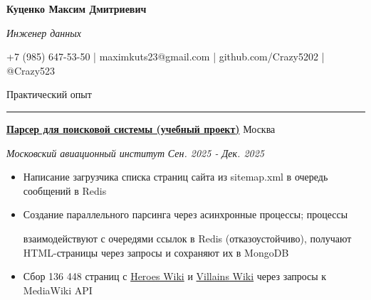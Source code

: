\documentclass[14pt, a4paper, oneside]{extarticle}
\begin{document}



\begin{center}
    \textbf{\LARGE Куценко Максим Дмитриевич}
    
    \textit{\Large Инженер данных}
\end{center}

\begin{center}
	\vspace{-0.5\intextsep}
	\small
    \faPhone* \space +7 (985) 647-53-50 | \faEnvelope \space maximkuts23@gmail.com | \faGithub \space github.com/Crazy5202 | \faTelegram \space @Crazy523
\end{center}


\begin{flushleft}
	\vspace{-\intextsep}
	\large Практический опыт
\end{flushleft}

\vspace{-0.8\intextsep}
\hrule


\begin{flushleft}
	\vspace{-0.8\intextsep}
	\quad
	\href{https://github.com/Crazy5202/infsearch/tree/main/lab2/core}{\textbf{Парсер для поисковой системы (учебный проект)}}
	\hfill
	Москва
\end{flushleft}

\begin{flushleft}
	\vspace{-1\intextsep}
	\quad
	\textit{Московский авиационный институт}
	\hfill
	\textit{\small Сен. 2025 - Дек. 2025}
\end{flushleft}


\begin{itemize}
	\vspace{-2\intextsep}
	\item Написание загрузчика списка страниц сайта из sitemap.xml в очередь сообщений в Redis
	\vspace{-0.8\intextsep}
	\item Создание параллельного парсинга через асинхронные процессы; процессы 
	
	\vspace{-0.5\intextsep}
	взаимодействуют с очередями ссылок в Redis (отказоустойчиво), получают HTML-страницы через запросы и сохраняют их в MongoDB
	\vspace{-0.8\intextsep}
	\item Сбор 136 448 страниц с \href{https://heroes.fandom.com}{Heroes Wiki} и \href{https://villains.fandom.com}{Villains Wiki} через запросы к MediaWiki API
\end{itemize}
\end{document}
